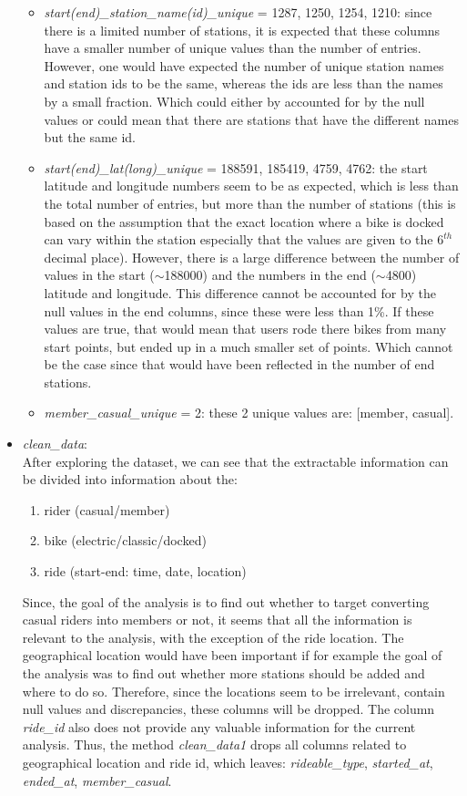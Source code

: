 \documentclass[12pt]{article}
\begin{document}
\begin{itemize}
\begin{itemize}
	\item \textit{start(end)\_station\_name(id)\_unique} = 1287, 1250, 1254, 1210: since there is a limited number of stations, it is expected that these columns have a smaller number of unique values than the number of entries. However, one would have expected the number of unique station names and station ids to be the same, whereas the ids are less than the names by a small fraction. Which could either by accounted for by the null values or could mean that there are stations that have the different names but the same id.
	\item \textit{start(end)\_lat(long)\_unique} = 188591, 185419, 4759, 4762: the start latitude and longitude numbers seem to be as expected, which is less than the total number of entries, but more than the number of stations (this is based on the assumption that the exact location where a bike is docked can vary within the station especially that the values are given to the $6^{th}$ decimal place). However, there is a large difference between the number of values in the start ($\sim$188000) and the numbers in the end ($\sim$4800) latitude and longitude. This difference cannot be accounted for by the null values in the end columns, since these were less than 1\%. If these values are true, that would mean that users rode there bikes from many start points, but ended up in a much smaller set of points. Which cannot be the case since that would have been reflected in the number of end stations. 
	\item \textit{member\_casual\_unique} = 2: these 2 unique values are: [member, casual].
\end{itemize}
	
	\item \textit{clean\_data}:\\
	After exploring the dataset, we can see that the extractable information can be divided into information about the:
	\begin{enumerate} 
	\item rider (casual/member)
	\item bike (electric/classic/docked)
	\item ride (start-end: time, date, location)
	\end{enumerate}
Since, the goal of the analysis is to find out whether to target converting casual riders into members or not, it seems that all the information is relevant to the analysis, with the exception of the ride location. The geographical location would have been important if for example the goal of the analysis was to find out whether more stations should be added and where to do so. Therefore, since the locations seem to be irrelevant, contain null values and discrepancies, these columns will be dropped. The column \textit{ride\_id} also does not provide any valuable information for the current analysis. Thus, the method \textit{clean\_data1} drops all columns related to geographical location and ride id, which leaves: \textit{rideable\_type}, \textit{started\_at}, \textit{ended\_at}, \textit{member\_casual}. 



\end{itemize}
\end{document}
